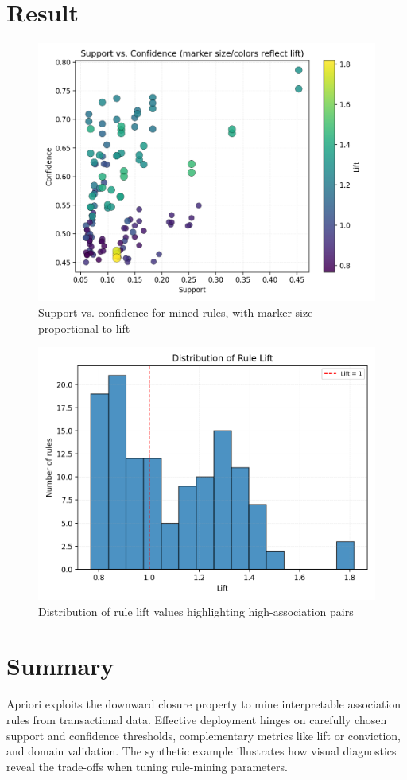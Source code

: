 ﻿\documentclass[12pt]{article}
\begin{document}
\section{Result}
\begin{figure}[H]
  \centering
  \includegraphics[width=0.82\linewidth]{apriori_support_confidence.png}
  \caption{Support vs. confidence for mined rules, with marker size proportional to lift}
  \label{fig:apriori_support_confidence}
\end{figure}

\begin{figure}[H]
  \centering
  \includegraphics[width=0.78\linewidth]{apriori_lift_distribution.png}
  \caption{Distribution of rule lift values highlighting high-association pairs}
  \label{fig:apriori_lift_distribution}
\end{figure}

\FloatBarrier
\section{Summary}
Apriori exploits the downward closure property to mine interpretable association rules from transactional data. Effective deployment hinges on carefully chosen support and confidence thresholds, complementary metrics like lift or conviction, and domain validation. The synthetic example illustrates how visual diagnostics reveal the trade-offs when tuning rule-mining parameters.
\end{document}
